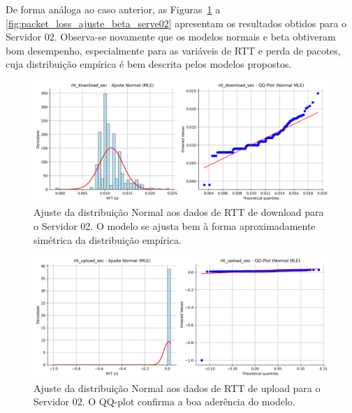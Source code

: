 \documentclass{article}
\begin{document}
De forma análoga ao caso anterior, as Figuras~\ref{fig:rtt_download_sec_ajuste_normal_server02}
a \ref{fig:packet_loss_ajuste_beta_serve02} apresentam os resultados obtidos
para o Servidor 02. Observa-se novamente que os modelos normais e beta obtiveram
bom desempenho, especialmente para as variáveis de RTT e perda de pacotes,
cuja distribuição empírica é bem descrita pelos modelos propostos.

\begin{figure}[htp]
	\includegraphics[width=\textwidth]{../figures/mle/rtt_download_sec_ajuste_normal_server02.png}
	\caption{Ajuste da distribuição Normal aos dados de RTT de download para o Servidor 02. O modelo se ajusta bem à forma aproximadamente simétrica da distribuição empírica.}
	\label{fig:rtt_download_sec_ajuste_normal_server02}
\end{figure}

\begin{figure}[htp]
	\includegraphics[width=\textwidth]{../figures/mle/rtt_upload_sec_ajuste_normal_server02.png}
	\caption{Ajuste da distribuição Normal aos dados de RTT de upload para o Servidor 02. O QQ-plot confirma a boa aderência do modelo.}
	\label{fig:rtt_upload_sec_ajuste_normal_server02}
\end{figure}
\end{document}

